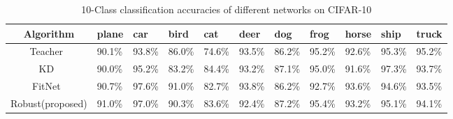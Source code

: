 \documentclass[journal]{IEEEtran}
\begin{document}
\begin{table*}[htb]
\setlength{\abovecaptionskip}{0.2cm}
\setlength{\belowcaptionskip}{0.2cm}
\renewcommand\arraystretch{1}
\centering
\small
\caption{10-Class classification accuracies of different networks on CIFAR-10}
\begin{tabular}{|c|*{10}{p{}<{\centering}|}}
\hline
\textbf{Algorithm} &  \textbf{plane}  &  \textbf{car}  &  \textbf{bird}  &  \textbf{cat}  &  \textbf{deer}  &  \textbf{dog}  &  \textbf{frog}  &  \textbf{horse}  &  \textbf{ship}  &  \textbf{truck}   \\
\hline
\hline
Teacher~\cite{goodfellow2013maxout}  & 90.1\%  &  93.8\%  &  86.0\%  &  74.6\%  &  93.5\%  &  86.2\%  &  95.2\%  &  92.6\%  &  95.3\%  &  95.2\%   \\
\hline
KD~\cite{hinton2015distilling}  & 90.0\%  &  95.2\%  &  83.2\%  &  84.4\%  &  93.2\%  &  87.1\%  &  95.0\%  &  91.6\%  &  97.3\%  &  93.7\%  \\
\hline
FitNet~\cite{romero2014fitnets}  & 90.7\%  &  97.6\%  &  91.0\%  &  82.7\%  &  93.8\%  &  86.2\%  &  92.7\%  &  93.6\%  &  94.6\%  &  93.5\%   \\
\hline
\hline
Robust(proposed)  & 91.0\%  &  97.0\%  &  90.3\%  &  83.6\%  &  92.4\%  &  87.2\%  &  95.4\%  &  93.2\%  &  95.1\%  &  94.1\%   \\
\hline
\end{tabular}
\label{tab_cifar_class}
\end{table*}
\end{document}
